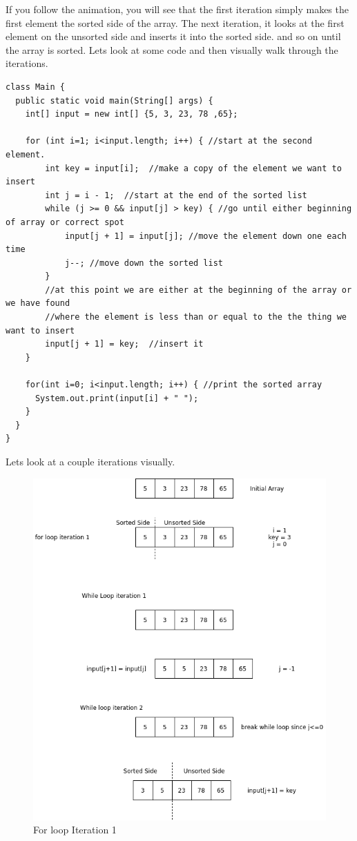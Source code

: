 \documentclass[11]{article}
\begin{document}
If you follow the animation, you will see that the first iteration simply makes the first element the sorted side of the array. The next iteration, it looks at the first element on the unsorted side and inserts it into the sorted side. and so on until the array is sorted. Lets look at some code and then visually walk through the iterations.
\pagebreak
\begin{lstlisting}
class Main {
  public static void main(String[] args) {
    int[] input = new int[] {5, 3, 23, 78 ,65};

    for (int i=1; i<input.length; i++) { //start at the second element.
        int key = input[i];  //make a copy of the element we want to insert
        int j = i - 1;  //start at the end of the sorted list
        while (j >= 0 && input[j] > key) { //go until either beginning of array or correct spot 
            input[j + 1] = input[j]; //move the element down one each time
            j--; //move down the sorted list
        }
        //at this point we are either at the beginning of the array or we have found
        //where the element is less than or equal to the the thing we want to insert
        input[j + 1] = key;  //insert it
    }

    for(int i=0; i<input.length; i++) { //print the sorted array
      System.out.print(input[i] + " ");
    }
  }
}
\end{lstlisting}
Lets look at a couple iterations visually.
\begin{figure}[H]
	\centering
	\includegraphics[scale=0.75]{iteration1InsertionSort.png}
	\caption{For loop Iteration 1}
\end{figure}
\end{document}
